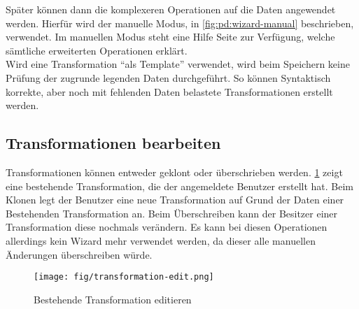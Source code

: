 Später können dann die komplexeren Operationen auf die Daten angewendet werden. Hierfür wird der manuelle Modus, in \cref{fig:pd:wizard-manual} beschrieben, verwendet. Im manuellen Modus steht eine Hilfe Seite zur Verfügung, welche sämtliche erweiterten Operationen erklärt.\\
Wird eine Transformation ``als Template'' verwendet, wird beim Speichern keine Prüfung der zugrunde legenden Daten durchgeführt. So können Syntaktisch korrekte, aber noch mit fehlenden Daten belastete Transformationen erstellt werden.

\subsection{Transformationen bearbeiten}
Transformationen können entweder geklont oder überschrieben werden. \cref{fig:pd:transformation-edit} zeigt eine bestehende Transformation, die der angemeldete Benutzer erstellt hat. Beim Klonen legt der Benutzer eine neue Transformation auf Grund der Daten einer Bestehenden Transformation an. Beim Überschreiben kann der Besitzer einer Transformation diese nochmals verändern. Es kann bei diesen Operationen allerdings kein Wizard mehr verwendet werden, da dieser alle manuellen Änderungen überschreiben würde.
\begin{figure}[H]
\centering
\texttt{[image: fig/transformation-edit.png]}
\caption{Bestehende Transformation editieren}
\label{fig:pd:transformation-edit}
\end{figure}